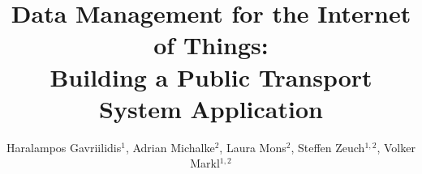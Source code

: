 \documentclass[sigconf,edbt]{acmart-edbt2020}
\begin{document}
\title{Data Management for the Internet of Things: \\Building a Public Transport System Application}
  
\author{Haralampos Gavriilidis$^1$, Adrian Michalke$^2$, Laura Mons$^2$, Steffen Zeuch$^{1,2}$, Volker Markl$^{1,2}$}





%
% 




\maketitle
\end{document}
